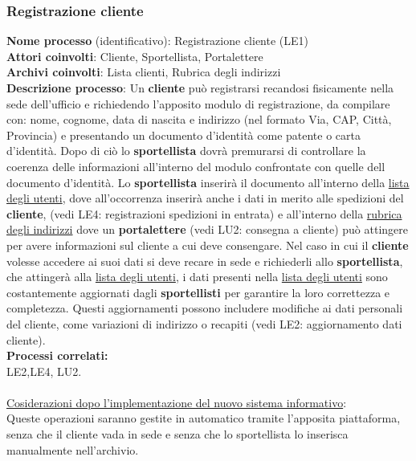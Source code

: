 \documentclass[a4paper,12pt]{article}
\begin{document}
\subsubsection{Registrazione cliente}
\textbf{Nome processo} (identificativo): Registrazione cliente (LE1) \\
\textbf{Attori coinvolti}: Cliente, Sportellista, Portalettere \\
\textbf{Archivi coinvolti}: Lista clienti, Rubrica degli indirizzi\\ 
\textbf{Descrizione processo}: Un \textbf{cliente} può registrarsi recandosi fisicamente nella sede dell'ufficio e richiedendo l'apposito modulo di registrazione, 
da compilare con: nome, cognome, data di nascita e indirizzo (nel formato Via, CAP, Città, Provincia) e presentando un documento d'identità come patente o carta d'identità. 
Dopo di ciò lo \textbf{sportellista} dovrà premurarsi di controllare la coerenza delle informazioni all'interno del modulo confrontate con quelle dell documento d'identità. 
Lo \textbf{sportellista} inserirà il documento all'interno della \underline{lista degli utenti}, dove all'occorrenza inserirà anche i dati in merito alle spedizioni del \textbf{cliente}, (vedi LE4: registrazioni spedizioni in entrata) e all'interno della \underline{rubrica degli indirizzi} dove un \textbf{portalettere} 
(vedi LU2: consegna a cliente) può attingere per avere informazioni sul cliente a cui deve consengare.  Nel caso in cui il \textbf{cliente} volesse accedere ai 
suoi dati si deve recare in sede e richiederli allo \textbf{sportellista}, che attingerà alla \underline{lista degli utenti}, i dati presenti nella 
\underline{lista degli utenti} sono costantemente aggiornati dagli \textbf{sportellisti} per garantire la loro correttezza e completezza. 
Questi aggiornamenti possono includere modifiche ai dati personali del cliente, come variazioni di indirizzo o recapiti (vedi LE2: aggiornamento dati cliente). \\
\textbf{Processi correlati:}\\LE2,LE4, LU2.\\ \\
\underline{Cosiderazioni dopo l'implementazione del nuovo sistema informativo}: \\ Queste operazioni saranno gestite in automatico tramite l'apposita piattaforma, 
senza che il cliente vada in sede e senza che lo sportellista lo inserisca manualmente nell'archivio.
\end{document}
